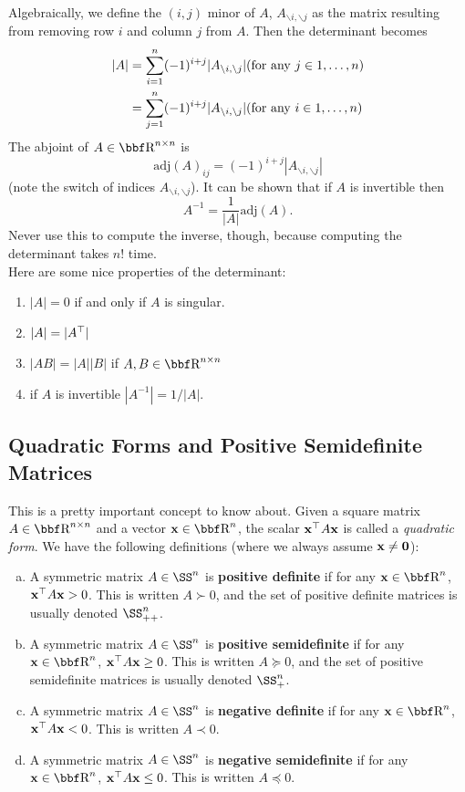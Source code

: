\documentclass{article}
\begin{document}
Algebraically, we define the $(i,j)$ minor of $A$, $A_{\backslash i, \backslash j}$
as the matrix resulting from removing row $i$ and column $j$ from $A$. Then the
determinant becomes
\begin{align*}
    |A| &= \sum_{i=1}^n (-1)^{i+j}|A_{\backslash i,\backslash j}| \hfill \text{(for any $j\in 1,\dots,n$)}\\
        &= \sum_{j=1}^n (-1)^{i+j}|A_{\backslash i,\backslash j}| \hfill \text{(for any $i\in 1,\dots,n$)}\\
\end{align*}
The abjoint of $A\in\RR^{n\times n}$ is
\[
    \mathrm{adj}(A)_{ij} = (-1)^{i+j}|A_{\backslash i,\backslash j}|
\]
(note the switch of indices $A_{\backslash i,\backslash j}$). It can be shown that if $A$ is invertible
then
\[
    A^{-1} = \frac{1}{|A|}\mathrm{adj}(A).
\]
Never use this to compute the inverse, though, because computing the determinant takes
$n!$ time.\\

Here are some nice properties of the determinant:
\begin{enumerate}
    \item $|A|=0$ if and only if $A$ is singular.
    \item $|A|=|A^\top|$
    \item $|AB|=|A||B|$ if $A,B\in\RR^{n\times n}$
    \item if $A$ is invertible $|A^{-1}| = 1/|A|$.
\end{enumerate}

\subsection{Quadratic Forms and Positive Semidefinite Matrices}

This is a pretty important concept to know about. Given a square matrix $A\in\RR^{n\times n}$
and a vector $\xx\in\RR^n$, the scalar ${\bf x}^\top A{\bf x}$ is called a
\textit{quadratic form}. We have the following definitions (where we
always assume ${\bf x} \neq {\bf 0}$):
\begin{enumerate}[(a)]
    \item A symmetric matrix $A\in\SS^n$ is \textbf{positive definite}
        if for any $\xx\in\RR^n$, ${\bf x}^\top A{\bf x} > 0$. This is written
        $A \succ 0$, and the set of positive definite matrices is
        usually denoted $\SS_{++}^n$.
    \item A symmetric matrix $A\in\SS^n$ is \textbf{positive semidefinite}
        if for any $\xx\in\RR^n$, ${\bf x}^\top A{\bf x} \geq 0$. This is written
        $A \succeq 0$, and the set of positive semidefinite matrices is
        usually denoted $\SS_{+}^n$.
    \item A symmetric matrix $A\in\SS^n$ is \textbf{negative definite}
        if for any $\xx\in\RR^n$, ${\bf x}^\top A{\bf x} < 0$. This is written
        $A \prec 0$.
    \item A symmetric matrix $A\in\SS^n$ is \textbf{negative semidefinite}
        if for any $\xx\in\RR^n$, ${\bf x}^\top A{\bf x} \leq 0$. This is written
        $A \preceq 0$.
\end{enumerate}
\end{document}
